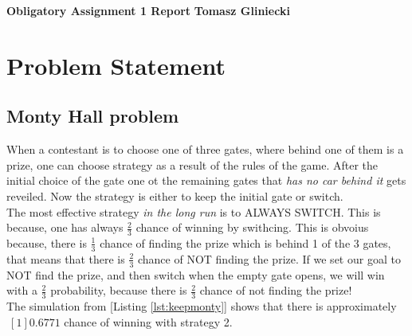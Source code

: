 \documentclass[a4paper, 11pt]{article}
\begin{document}
\noindent
\large\textbf{Obligatory Assignment 1 Report} \hfill \textbf{Tomasz Gliniecki} \\

\section*{Problem Statement}
\subsection*{Monty Hall problem}
When a contestant is to choose one of three gates, where behind one of them is a prize, one can choose strategy as a result of the rules of the game. After the initial choice of the gate one ot the remaining gates that \emph{has no car behind it} gets reveiled. Now the strategy is either to keep the initial gate or switch.\cite{montyhall}\\
The most effective strategy \emph{in the long run} is to ALWAYS SWITCH. This is because, one has always $\frac{2}{3}$ chance of winning by swithcing. This is obvoius because, there is $\frac{1}{3}$ chance of finding the prize which is behind 1 of the 3 gates, that means that there is $\frac{2}{3}$ chance of NOT finding the prize. If we set our goal to NOT find the prize, and then switch when the empty gate opens, we will win with a $\frac{2}{3}$ probability, because there is $\frac{2}{3}$ chance of not finding the prize!\\
The simulation from [Listing \ref{lst:keepmonty}] shows that there is approximately $ ~[1] 0.6771 $ chance of winning with strategy 2.
\end{document}
